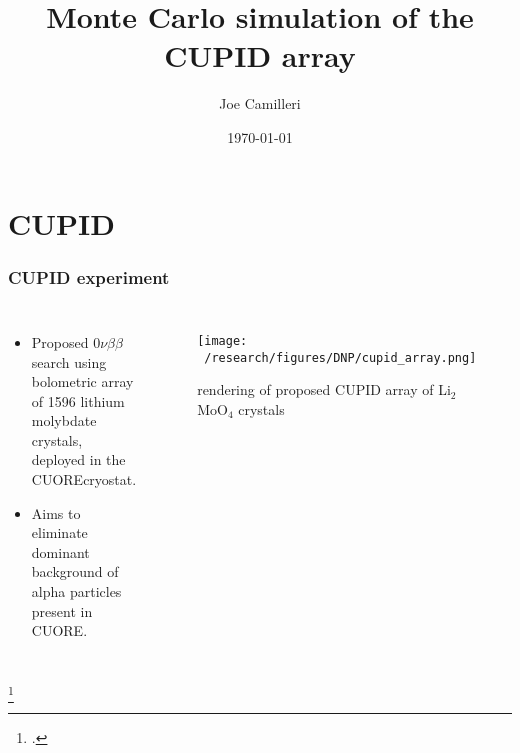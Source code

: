 \documentclass{beamer}
\title[CUPID array]{Monte Carlo simulation of the CUPID array} %
\author{Joe Camilleri} %
\institute[Virginia Tech] %
{
	DNP October 2021 \\ %
	\medskip
	\textit{jcamilleri@vt.edu} %
}
\date{\today} %
\begin{document}
	
	\begin{frame}
		\titlepage %
	\end{frame}
	
	
	
	\section{CUPID}
	\begin{frame}
		\frametitle{CUPID experiment}
		\begin{columns}[c] %
			
			\begin{itemize}
				\item Proposed $0\nu\beta\beta$ search using bolometric array of 1596 lithium molybdate crystals, deployed in the CUORE\footnotemark cryostat.
				\item Aims to eliminate dominant background of alpha particles present in CUORE.
			\end{itemize}
			
			\begin{figure}
			\texttt{[image: ~/research/figures/DNP/cupid\_array.png]}
			\caption{rendering of proposed CUPID array of Li$_2$MoO$_4$ crystals}
			\end{figure}
			
		\end{columns}
		\footcitetext{squid}
	\end{frame}
	
\end{document}
